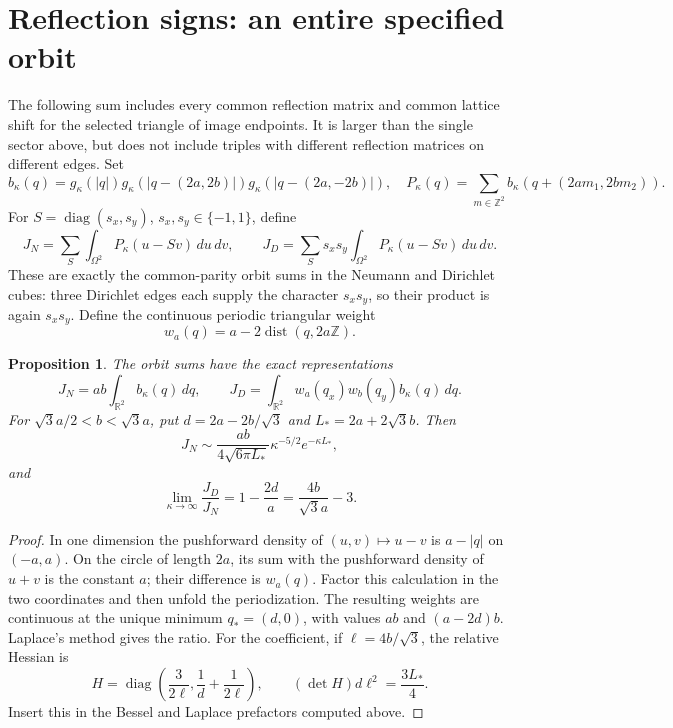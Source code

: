 \documentclass[11pt]{article}
\newtheorem{proposition}{Proposition}
\begin{document}
\section{Reflection signs: an entire specified orbit}
The following sum includes every common reflection matrix and common
lattice shift for the selected triangle of image endpoints. It is
larger than the single sector above, but does not include triples with
different reflection matrices on different edges.
Set
\[
 b_\kappa(q)=g_\kappa(|q|)
 g_\kappa(|q-(2a,2b)|)g_\kappa(|q-(2a,-2b)|),
 \quad P_\kappa(q)=\sum_{m\in\mathbb Z^2}
 b_\kappa(q+(2am_1,2bm_2)).
\]
For $S=\operatorname{diag}(s_x,s_y)$, $s_x,s_y\in\{-1,1\}$, define
\[
 J_N=\sum_S\int_{\Omega^2}P_\kappa(u-Sv)\,du\,dv,\qquad
 J_D=\sum_Ss_xs_y\int_{\Omega^2}P_\kappa(u-Sv)\,du\,dv.
\]
These are exactly the common-parity orbit sums in the Neumann and
Dirichlet cubes: three Dirichlet edges each supply the character
$s_xs_y$, so their product is again $s_xs_y$.
Define the continuous periodic triangular weight
\[
 w_a(q)=a-2\operatorname{dist}(q,2a\mathbb Z).
\]
\begin{proposition}
The orbit sums have the exact representations
\[
 J_N=ab\int_{\mathbb R^2}b_\kappa(q)\,dq,\qquad
 J_D=\int_{\mathbb R^2}w_a(q_x)w_b(q_y)b_\kappa(q)\,dq.
\]
For $\sqrt3a/2<b<\sqrt3a$, put $d=2a-2b/\sqrt3$ and
$L_*=2a+2\sqrt3b$. Then
\[
 J_N\sim\frac{ab}{4\sqrt{6\pi L_*}}
 \kappa^{-5/2}e^{-\kappa L_*},
\]
and
\[
 \lim_{\kappa\to\infty}\frac{J_D}{J_N}
 =1-\frac{2d}{a}=\frac{4b}{\sqrt3a}-3.
\]
\end{proposition}
\begin{proof}
In one dimension the pushforward density of $(u,v)\mapsto u-v$ is
$a-|q|$ on $(-a,a)$. On the circle of length $2a$, its sum with the
pushforward density of $u+v$ is the constant $a$; their difference is
$w_a(q)$. Factor this calculation in the two coordinates and then
unfold the periodization. The resulting weights are continuous at
the unique minimum $q_*=(d,0)$, with values $ab$ and $(a-2d)b$.
Laplace's method gives the ratio. For the coefficient, if
$\ell=4b/\sqrt3$, the relative Hessian is
\[
 H=\operatorname{diag}\left(\frac{3}{2\ell},
 \frac1d+\frac1{2\ell}\right),\qquad
 (\det H)d\ell^2=\frac{3L_*}{4}.
\]
Insert this in the Bessel and Laplace prefactors computed above.
\end{proof}
\end{document}
